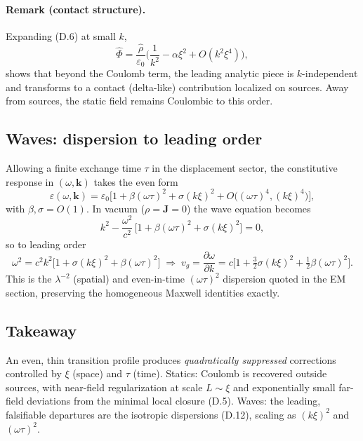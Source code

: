 \paragraph*{Remark (contact structure).} Expanding (D.6) at small $k$,
\[
\hat\Phi=\frac{\hat\rho}{\varepsilon_0}\Big(\frac{1}{k^2}-\alpha\xi^2+O(k^2\xi^4)\Big),\tag{D.9}
\]
shows that beyond the Coulomb term, the leading analytic piece is $k$-independent and transforms to a contact (delta-like) contribution localized on sources. Away from sources, the static field remains Coulombic to this order.

\subsection{Waves: dispersion to leading order}
Allowing a finite exchange time $\tau$ in the displacement sector, the constitutive response in $(\omega,\mathbf k)$ takes the even form
\[
\varepsilon(\omega,\mathbf k)=\varepsilon_0\Big[1+\beta(\omega\tau)^2+\sigma (k\xi)^2+O\big((\omega\tau)^4,(k\xi)^4\big)\Big],\tag{D.10}
\]
with $\beta,\sigma=O(1)$. In vacuum ($\rho=\mathbf J=0$) the wave equation becomes
\[
k^2-\frac{\omega^2}{c^2}\,\Big[1+\beta(\omega\tau)^2+\sigma (k\xi)^2\Big]=0,\tag{D.11}
\]
so to leading order
\[
\omega^2=c^2 k^2\Big[1+\sigma (k\xi)^2+\beta (\omega\tau)^2\Big]
\;\Rightarrow\;
v_g=\frac{\partial\omega}{\partial k}=c\Big[1+\tfrac{3}{2}\sigma (k\xi)^2+\tfrac{1}{2}\beta (\omega\tau)^2\Big].\tag{D.12}
\]
This is the $\lambda^{-2}$ (spatial) and even-in-time $(\omega\tau)^2$ dispersion quoted in the EM section, preserving the homogeneous Maxwell identities exactly.

\subsection{Takeaway}
An even, thin transition profile produces \emph{quadratically suppressed} corrections controlled by $\xi$ (space) and $\tau$ (time). Statics: Coulomb is recovered outside sources, with near-field regularization at scale $L\sim\xi$ and exponentially small far-field deviations from the minimal local closure (D.5). Waves: the leading, falsifiable departures are the isotropic dispersions (D.12), scaling as $(k\xi)^2$ and $(\omega\tau)^2$.
